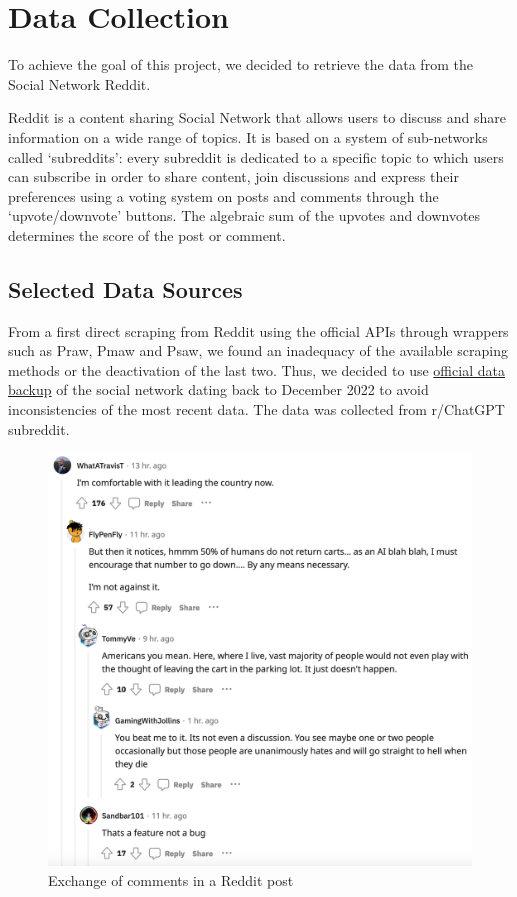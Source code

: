 \documentclass[sigchi]{acmart}
\begin{document}
\section{Data Collection}
To achieve the goal of this project, we decided to retrieve the data from the Social Network Reddit.\cite{reddit}

\noindent Reddit is a content sharing Social Network that allows users to discuss and share information on a wide range of topics. 
It is based on a system of sub-networks called `subreddits': every subreddit is dedicated to a specific topic to which users can subscribe in order to share content, join discussions and express their preferences using a voting system on posts and comments through the `upvote/downvote' buttons. The algebraic sum of the upvotes and downvotes determines the score of the post or comment.


\subsection{Selected Data Sources}
From a first direct scraping from Reddit using the official APIs through wrappers such as Praw, Pmaw and Psaw, we found an inadequacy of the available scraping methods or the deactivation of the last two. Thus, we decided to use \href{https://academictorrents.com/details/c398a571976c78d346c325bd75c47b82edf6124e/tech&filelist=1}{official data backup} of the social network dating back to December 2022 to avoid inconsistencies of the most recent data. The data was collected from r/ChatGPT subreddit.

\begin{figure}[hbpt]
  \centering
  \includegraphics[width=0.8\linewidth]{img/reddit2.png}
  \caption{Exchange of comments in a Reddit post}
  \label{fig:Reddit comments}
\end{figure}
\end{document}
